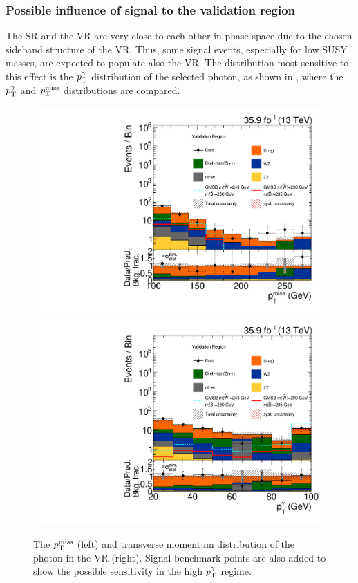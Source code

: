 \subsubsection*{Possible influence of signal to the validation region}
The SR and the VR are very close to each other in phase space due to the chosen sideband structure of the VR. Thus, some signal events, especially for low SUSY masses, are expected to populate also the VR. The distribution most sensitive to this effect is the $p_{\mathrm{T}}^{\gamma}$ distribution of the selected photon, as shown in , where the $p_{\mathrm{T}}^{\gamma}$ and $p_{\mathrm{T}}^\text{miss}$ distributions are compared.
\begin{figure}[tbp]
 \centering
 \includegraphics[width=\pairwidth]{figures/VR_signal_study/VR_LL_met_log}
 \includegraphics[width=\pairwidth]{figures/VR_signal_study/VR_LL_pt_g1_log}
 \caption{The $p_{\mathrm{T}}^\text{miss}$ (left) and transverse momentum distribution of the photon in the VR (right). Signal benchmark points are also added to show the possible sensitivity in the high $p_{\mathrm{T}}^{\gamma}$ regime.}
 \label{fig:signalContVR}
\end{figure}

